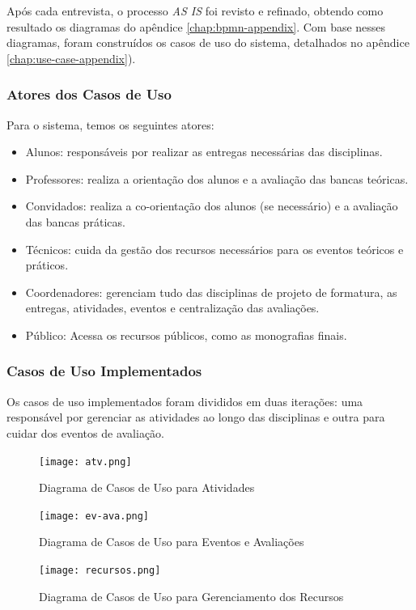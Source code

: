 Após cada entrevista, o processo \textit{AS IS} foi revisto e refinado, obtendo como resultado os diagramas do apêndice \ref{chap:bpmn-appendix}. Com base nesses diagramas, foram construídos os casos de uso do sistema, detalhados no apêndice \ref{chap:use-case-appendix}). 

\subsubsection{Atores dos Casos de Uso}
Para o sistema, temos os seguintes atores:

\begin{itemize}
    \item Alunos: responsáveis por realizar as entregas necessárias das disciplinas.
    \item Professores: realiza a orientação dos alunos e a avaliação das bancas teóricas.
    \item Convidados: realiza a co-orientação dos alunos (se necessário) e a avaliação das bancas práticas.
    \item Técnicos: cuida da gestão dos recursos necessários para os eventos teóricos e práticos.
    \item Coordenadores: gerenciam tudo das disciplinas de projeto de formatura, as entregas, atividades, eventos e centralização das avaliações.
    \item Público: Acessa os recursos públicos, como as monografias finais.
\end{itemize}

\subsubsection{Casos de Uso Implementados}
Os casos de uso implementados foram divididos em duas iterações: uma responsável por gerenciar as atividades ao longo das disciplinas e outra para cuidar dos eventos de avaliação.

\begin{figure}[H]
    \centering
    \texttt{[image: atv.png]}
    \caption{Diagrama de Casos de Uso para Atividades}
    \label{fig:use-case-atv}
\end{figure}

\begin{figure}[H]
    \centering
    \texttt{[image: ev-ava.png]}
    \caption{Diagrama de Casos de Uso para Eventos e Avaliações}
    \label{fig:use-case-ev-ava}
\end{figure}

\begin{figure}[H]
    \centering
    \texttt{[image: recursos.png]}
    \caption{Diagrama de Casos de Uso para Gerenciamento dos Recursos}
    \label{fig:use-case-recursos}
\end{figure}


